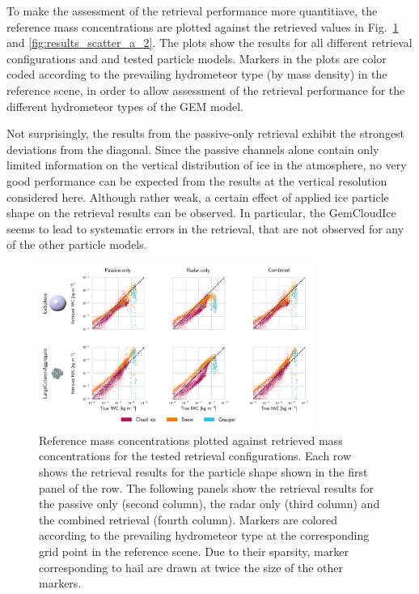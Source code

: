 \documentclass[journal abbreviation, manuscript]{copernicus}
\begin{document}
To make the assessment of the retrieval performance more quantitiave, the
reference mass concentrations are plotted against the retrieved values in
Fig.~\ref{fig:results_scatter_a_1} and \ref{fig:results_scatter_a_2}. The plots
show the results for all different retrieval configurations and and tested
particle models. Markers in the plots are color coded according to the
prevailing hydrometeor type (by mass density) in the reference scene, in order
to allow assessment of the retrieval performance for the different hydrometeor
types of the GEM model.

Not surprisingly, the results from the passive-only retrieval exhibit the
strongest deviations from the diagonal. Since the passive channels alone contain
only limited information on the vertical distribution of ice in the atmosphere,
no very good performance can be expected from the results at the vertical
resolution considered here. Although rather weak, a certain effect of applied
ice particle shape on the retrieval results can be observed. In particular, the
GemCloudIce seems to lead to systematic errors in the retrieval, that are not
observed for any of the other particle models.

\begin{figure}
\centering
\includegraphics[width = 0.8\textwidth]{../plots/results_scatter_a_1}
\caption{Reference mass concentrations plotted against retrieved mass
  concentrations for the tested retrieval configurations. Each row shows the
  retrieval results for the particle shape shown in the first panel of the row.
  The following panels show the retrieval results for the passive only (second
  column), the radar only (third column) and the combined retrieval (fourth
  column). Markers are colored according to the prevailing hydrometeor type at
  the corresponding grid point in the reference scene. Due to their sparsity,
  marker corresponding to hail are drawn at twice the size of the other
  markers.}
\label{fig:results_scatter_a_1}
\end{figure}
\end{document}
